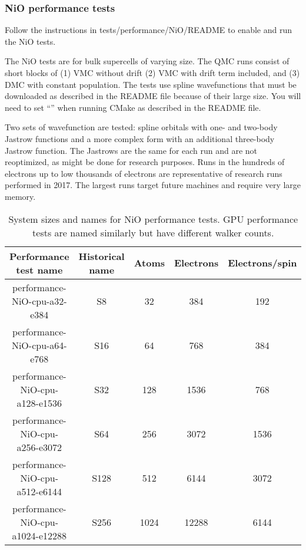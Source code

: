 \subsubsection{NiO performance tests}

Follow the instructions in tests/performance/NiO/README to
enable and run the NiO tests.

The NiO tests are for bulk supercells of varying size. The QMC runs consist of short blocks of (1) VMC
without drift (2) VMC with drift term included, and (3) DMC with
constant population. The tests use spline wavefunctions that must be
downloaded as described in the README file because of their large size. You
will need to set ``''
when running CMake as
described in the README file.

Two sets of wavefunction are tested: spline orbitals with one- and
two-body Jastrow functions and a more complex form with an additional
three-body Jastrow function. The Jastrows are the same for each run
and are not reoptimized, as might be done for research purposes.  Runs
in the hundreds of electrons up to low thousands of electrons are representative of
research runs performed in 2017. The largest runs target
future machines and require very large memory.

\begin{table}[h]
\begin{center}
  \caption{System sizes and names for NiO performance tests. GPU performance
    tests are named similarly but have different walker counts.}
\begin{tabular}{|c|c|c|c|c|}
\hline
\bfseries Performance test name&  \bfseries Historical name &\bfseries Atoms& \bfseries Electrons&  \bfseries Electrons/spin \\
\hline
performance-NiO-cpu-a32-e384  & S8 & 32 & 384 & 192 \\
performance-NiO-cpu-a64-e768  & S16 & 64 & 768 & 384 \\
performance-NiO-cpu-a128-e1536 & S32 & 128 & 1536 & 768 \\
performance-NiO-cpu-a256-e3072 & S64 & 256 & 3072 & 1536 \\
performance-NiO-cpu-a512-e6144 & S128 & 512 & 6144 & 3072 \\
performance-NiO-cpu-a1024-e12288& S256 & 1024 & 12288 & 6144 \\
\hline
\end{tabular}

  \label{tab:niotests}
\end{center}
\end{table}

